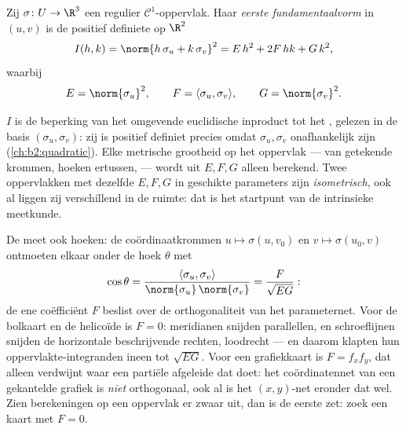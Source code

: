 \begin{definition}\label{def:b2:surfaces:fff}
Zij $\sigma \colon U \to \R^3$ een regulier
$\mathcal{C}^1$-oppervlak. Haar \emph{eerste
fundamentaalvorm} in $(u,v)$ is de
positief definiete  op $\R^2$
\[
I(h, k) = \norm{h\,\sigma_u + k\,\sigma_v}^2
= E\,h^2 + 2F\,hk + G\,k^2,
\]
waarbij
\[
E = \norm{\sigma_u}^2,
\qquad
F = \langle \sigma_u, \sigma_v\rangle,
\qquad
G = \norm{\sigma_v}^2 .
\]
\end{definition}

\begin{remark}
$I$ is de beperking van het omgevende euclidische inproduct tot het
, gelezen in de basis $(\sigma_u, \sigma_v)$: zij is
positief definiet precies omdat $\sigma_u, \sigma_v$ onafhankelijk
zijn (\cref{ch:b2:quadratic}). Elke metrische grootheid op het
oppervlak ---  van getekende krommen, hoeken ertussen,
 --- wordt uit $E, F, G$ alleen berekend. Twee
oppervlakken met dezelfde $E, F, G$ in geschikte parameters zijn
\emph{isometrisch}, ook al liggen zij verschillend in de ruimte:
dat is het startpunt van de intrinsieke meetkunde.
\end{remark}

\begin{example}\label{ex:b2:surfaces:coordangle}
De  meet ook hoeken: de coördinaatkrommen $u
\mapsto \sigma(u, v_0)$ en $v \mapsto \sigma(u_0, v)$ ontmoeten
elkaar onder de hoek $\theta$ met
\[
\cos\theta = \frac{\langle\sigma_u,
\sigma_v\rangle}{\norm{\sigma_u}\,\norm{\sigma_v}}
= \frac{F}{\sqrt{EG}} :
\]
de ene coëfficiënt $F$ beslist over de orthogonaliteit van het
parameternet. Voor de bolkaart en de helicoïde is $F = 0$:
meridianen snijden parallellen, en schroeflijnen snijden de
horizontale beschrijvende rechten, loodrecht --- en daarom klapten
hun oppervlakte-integranden ineen tot $\sqrt{EG}$. Voor een
grafiekkaart is $F = f_xf_y$, dat alleen verdwijnt waar een
partiële afgeleide dat doet: het coördinatennet van een gekantelde
grafiek is \emph{niet} orthogonaal, ook al is het $(x, y)$-net
eronder dat wel. Zien berekeningen op een oppervlak er zwaar uit,
dan is de eerste zet: zoek een kaart met $F = 0$.
\end{example}

